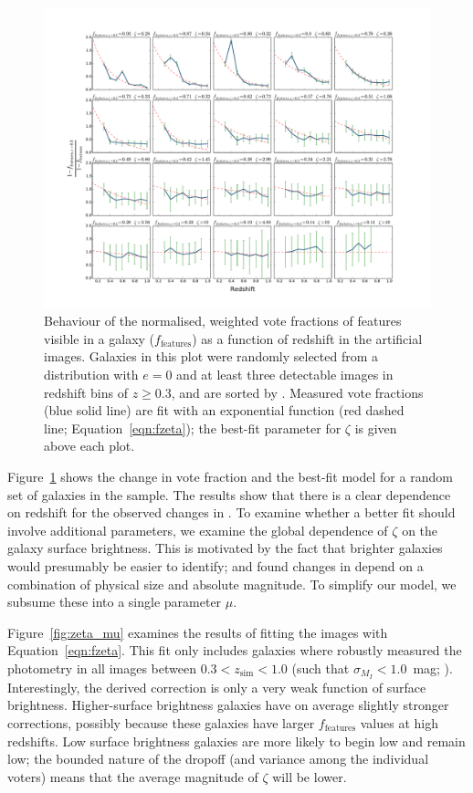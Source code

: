 \documentclass[a4paper,fleqn,usenatbib]{mnras}
\begin{document}
\begin{figure}
\center
\includegraphics[width=\textwidth]{figures/zeta_examples_sorted.pdf}
\caption{Behaviour of the normalised, weighted vote fractions of features
visible in a galaxy ($f_\textrm{features}$) as a function of redshift in the
artificial \ferengi{} images. Galaxies in this plot were randomly selected from
a distribution with $e=0$ and at least three detectable images in redshift bins
of $z\ge0.3$, and are sorted by \ffeaturesrest. Measured vote fractions (blue
solid line) are fit with an exponential function (red dashed line;
Equation~\ref{eqn:fzeta}); the best-fit parameter for $\zeta$ is given above
each plot.}
\label{fig:zeta_examples}
\end{figure}

Figure~\ref{fig:zeta_examples} shows the change in vote fraction and the
best-fit model for a random set of galaxies in the \ferengi{} sample. The
results show that there is a clear dependence on redshift for the observed
changes in \ffeatures. To examine whether a better fit should involve
additional parameters, we examine the global dependence of $\zeta$ on the
galaxy surface brightness. This is motivated by the fact that brighter galaxies
would presumably be easier to identify; \citet{bam09} and \citet{wil13} found
changes in \ffeatures{} depend on a combination of physical size and
absolute magnitude. To simplify our model, we subsume these into a single
parameter $\mu$.

Figure~\ref{fig:zeta_mu} examines the results of fitting the \ferengi{} images
with Equation~\ref{eqn:fzeta}. This fit only includes galaxies where
\sextractor{} robustly measured the photometry in all images between
$0.3<z_\mathrm{sim}<1.0$ (such that $\sigma_{M_I}<1.0$~mag; \citealt{mel16}). Interestingly, the
derived correction is only a very weak function of surface brightness.
Higher-surface brightness galaxies have on average slightly stronger
corrections, possibly because these galaxies have larger $f_\textrm{features}$
values at high redshifts. Low surface brightness galaxies are more likely to
begin low and remain low; the bounded nature of the dropoff (and variance among
the individual voters) means that the average magnitude of $\zeta$ will be
lower. 
\end{document}
